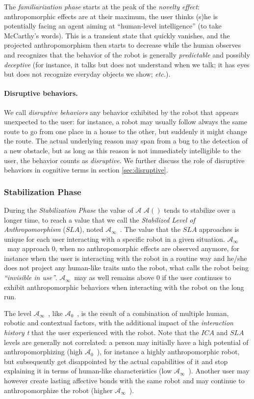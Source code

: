 \documentclass{frontiersSCNS} %
\newcommand{\etc}{\textit{etc.}\xspace}
\newcommand{\Ant}[1][]{%
      \ifthenelse{\isempty{#1}}%
        {$\mathcal{A}$}
        {$\mathcal{A}(#1)$}
}
\newcommand{\ICA}{{$\mathcal{A}_0$~}}
\newcommand{\SLA}{{$\mathcal{A}_\infty$~}}
\begin{document}
The \emph{familiarization phase} starts at the peak of the \emph{novelty
effect}: anthropomorphic effects are at their maximum, the user thinks (s)he is
potentially facing an agent aiming at ``human-level intelligence'' (to take
McCarthy's words). This is a transient state that quickly vanishes, and the
projected anthropomorphism then starts to decrease while the human observes and
recognizes that the behavior of the robot is generally \emph{predictable} and
possibly \emph{deceptive} (for instance, it talks but does not understand when
we talk; it has eyes but does not recognize everyday objects we show; \etc).

\paragraph{Disruptive behaviors.}

We call \emph{disruptive behaviors} any behavior exhibited by the robot that
appears unexpected to the user: for instance, a robot may usually follow always
the same route to go from one place in a house to the other, but suddenly it
might change the route. The actual underlying reason may span from a bug to the
detection of a new obstacle, but as long as this reason is not immediately
intelligible to the user, the behavior counts as \emph{disruptive}. We further
discuss the role of disruptive behaviors in cognitive terms in section
\ref{sec:disruptive}.


\subsubsection{Stabilization Phase\\}

During the \textit{Stabilization Phase} the value of \Ant tends to stabilize over
a longer time, to reach a value that we call the \textit{Stabilized Level of
Anthropomorphism} ($SLA$), noted \SLA. The value that the
$SLA$ approaches is unique for each user interacting with a specific robot in a
given situation. \SLA may approach $0$, when no anthropomorphic effects
are observed anymore, for instance when the user is interacting with the robot
in a routine way and he/she does not project any human-like traits unto the
robot, what \cite{takayama_toward_2011} calls the robot being
\textit{``invisible in use''}. \SLA may as well remains above 0 if the user
continues to exhibit anthropomorphic behaviors when interacting with the robot
on the long run.

The level \SLA, like \ICA, is the result of a combination of multiple human,
robotic and contextual factors, with the additional impact of the
\emph{interaction history t} that the user experienced with the robot. Note that
the $ICA$ and $SLA$ levels are generally not correlated: a person may initially
have a high potential of anthropomorphizing (high \ICA), for instance a highly
anthropomorphic robot, but subsequently get disappointed by the actual
capabilities of it and stop explaining it in terms of human-like characteristics
(low \SLA). Another user may however create lasting affective bonds with the
same robot and may continue to anthropomorphize the robot (higher \SLA).
\end{document}
